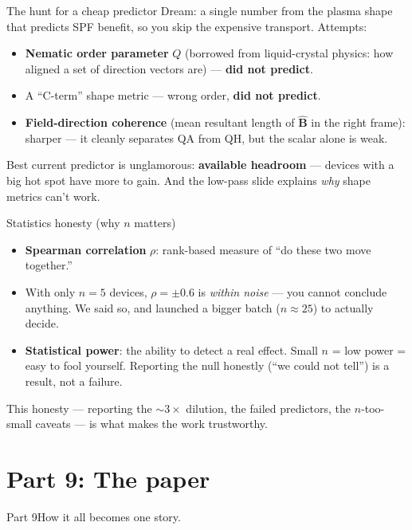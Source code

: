 \documentclass[11pt,aspectratio=169]{beamer}
\newcommand{\key}[1]{\textcolor{key}{\textbf{#1}}}
\newcommand{\bhat}{\hat{\mathbf{B}}}
\begin{document}
\begin{frame}{The hunt for a cheap predictor}
Dream: a single number from the plasma shape that predicts SPF benefit, so you skip the
expensive transport. Attempts:
\begin{itemize}
\item \key{Nematic order parameter} $Q$ (borrowed from liquid-crystal physics: how aligned a
set of direction vectors are) --- \key{did not predict}.
\item A ``C-term'' shape metric --- wrong order, \key{did not predict}.
\item \key{Field-direction coherence} (mean resultant length of $\bhat$ in the right frame):
sharper --- it cleanly separates QA from QH, but the scalar alone is weak.
\end{itemize}
Best current predictor is unglamorous: \key{available headroom} --- devices with a big hot
spot have more to gain. And the low-pass slide explains \emph{why} shape metrics can't work.
\end{frame}

\begin{frame}{Statistics honesty (why $n$ matters)}
\begin{itemize}
\item \key{Spearman correlation} $\rho$: rank-based measure of ``do these two move together.''
\item With only \key{$n=5$} devices, $\rho=\pm 0.6$ is \emph{within noise} --- you cannot
conclude anything. We said so, and launched a bigger batch ($n\approx 25$) to actually decide.
\item \key{Statistical power}: the ability to detect a real effect. Small $n$ = low power =
easy to fool yourself. Reporting the null honestly (``we could not tell'') is a result, not a
failure.
\end{itemize}
This honesty --- reporting the $\sim\!3\times$ dilution, the failed predictors, the
$n$-too-small caveats --- is what makes the work trustworthy.
\end{frame}

\section{Part 9: The paper}
\begin{frame}{Part 9}\Large How it all becomes one story.\end{frame}
\end{document}
